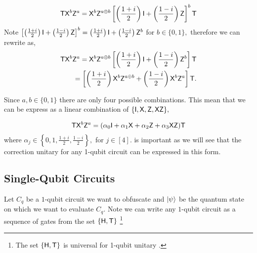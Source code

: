 \begin{equation}
\label{eq:pgate1}
{\sf T} {\sf X}^b {\sf Z}^a={\sf X}^b {\sf Z}^{a\oplus b}\left[\left(\frac{1+i}{2}\right) {\sf I} + \left(\frac{1-i}{2}\right){\sf Z}\right]^b {\sf T}
\end{equation}
Note  $\left[\left(\frac{1+i}{2}\right) {\sf I} + \left(\frac{1-i}{2}\right){\sf Z}\right]^b=\left(\frac{1+i}{2}\right) {\sf I} + \left(\frac{1-i}{2}\right){\sf Z}^b$ for $b \in \{0,1\},$ therefore we can rewrite   as,
\begin{equation}
\label{eq:pgate2}
\begin{aligned}
{\sf T} {\sf X}^b {\sf Z}^a={\sf X}^b {\sf Z}^{a\oplus b}\left[\left(\frac{1+i}{2}\right) {\sf I} + \left(\frac{1-i}{2}\right){\sf Z}^b\right] {\sf T} \\
=\left[\left(\frac{1+i}{2}\right) {\sf X}^b {\sf Z}^{a\oplus b} + \left(\frac{1-i}{2}\right){\sf X}^b {\sf Z}^a\right] {\sf T}. \\
\end{aligned}
\end{equation}

Since $a,b\in\{0,1\}$ there are only four possible combinations. This mean that we can be express  as a linear combination of $\{{\sf I}, {\sf X}, {\sf Z}, {\sf X} {\sf Z}\},$

\begin{equation}
\label{eq:pgate3}
\begin{aligned}
{\sf T} {\sf X}^b {\sf Z}^a= (\alpha_0 {\sf I} +  \alpha_1 {\sf X} + \alpha_2 {\sf Z} + \alpha_3 {\sf X}{\sf Z}){\sf T} \\
\end{aligned}
\end{equation}
where $\alpha_j \in\left\{0,1, \frac{1+i}{2}, \frac{1-i}{2}\right\},$ for  $j\in[4]$.  is important as we will see that the correction unitary for any 1-qubit circuit can be expressed in this form.

\subsection{Single-Qubit Circuits}
\label{sec:1-qubit}

Let $C_q$ be a $1$-qubit circuit we want to obfuscate and ${\lvert}\psi\rangle$ be the quantum state on which we want to evaluate $C_q.$ Note we can write any $1$-qubit circuit as a sequence of gates from the set $\{{\sf H}, {\sf T}\}$ \footnote{The set $\{{\sf H},  {\sf T}\}$ is universal for 1-qubit unitary \cite{KLM07}.}

